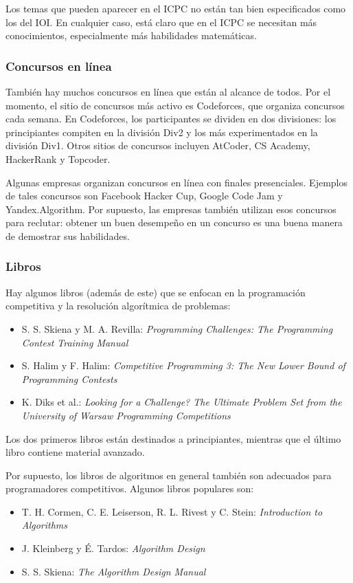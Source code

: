 Los temas que pueden aparecer en el ICPC no están tan bien
especificados como los del IOI.
En cualquier caso, está claro que en el ICPC se necesitan 
más conocimientos, especialmente más habilidades matemáticas.

\subsubsection{Concursos en línea}

También hay muchos concursos en línea que están al alcance de todos.
Por el momento, el sitio de concursos más activo es Codeforces,
que organiza concursos cada semana.
En Codeforces, los participantes se dividen en dos divisiones:
los principiantes compiten en la división Div2 y los más experimentados en la división Div1.
Otros sitios de concursos incluyen AtCoder, CS Academy, HackerRank y Topcoder.

Algunas empresas organizan concursos en línea con finales presenciales.
Ejemplos de tales concursos son Facebook Hacker Cup,
Google Code Jam y Yandex.Algorithm.
Por supuesto, las empresas también utilizan esos concursos para reclutar:
obtener un buen desempeño en un concurso es una buena manera de demostrar sus habilidades.

\subsubsection{Libros}

Hay algunos libros (además de este) que
se enfocan en la programación competitiva y la resolución algorítmica de problemas:

\begin{itemize}
\item S. S. Skiena y M. A. Revilla:
\emph{Programming Challenges: The Programming Contest Training Manual} \cite{ski03}
\item S. Halim y F. Halim:
\emph{Competitive Programming 3: The New Lower Bound of Programming Contests} \cite{hal13}
\item K. Diks et al.: \emph{Looking for a Challenge? The Ultimate Problem Set from
the University of Warsaw Programming Competitions} \cite{dik12}
\end{itemize}

Los dos primeros libros están destinados a principiantes,
mientras que el último libro contiene material avanzado.

Por supuesto, los libros de algoritmos en general también son adecuados para
programadores competitivos.
Algunos libros populares son:

\begin{itemize}
\item T. H. Cormen, C. E. Leiserson, R. L. Rivest y C. Stein:
\emph{Introduction to Algorithms} \cite{cor09}
\item J. Kleinberg y É. Tardos:
\emph{Algorithm Design} \cite{kle05}
\item S. S. Skiena:
\emph{The Algorithm Design Manual} \cite{ski08}
\end{itemize}
